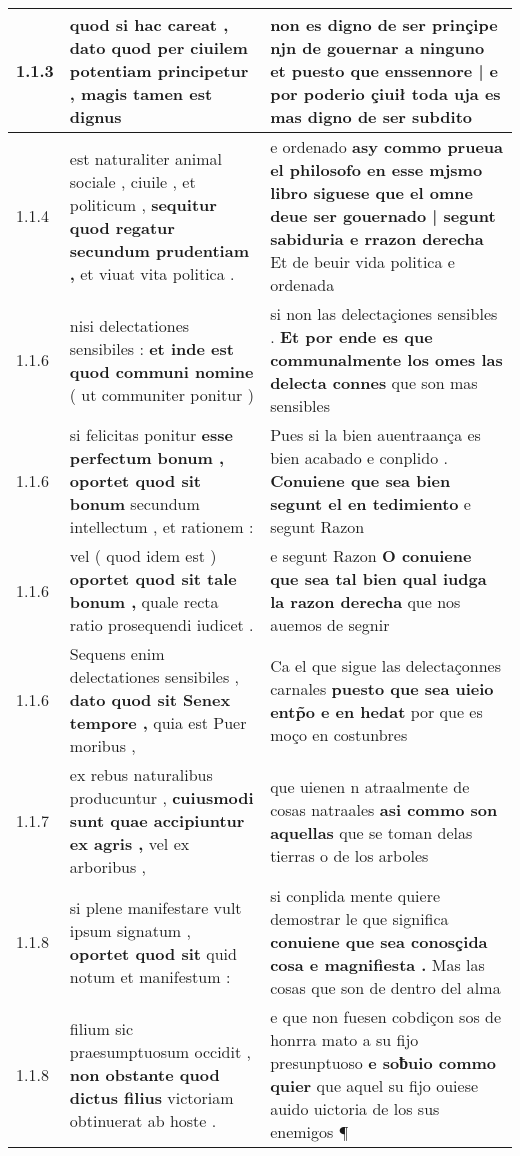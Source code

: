 \begin{tabular}{|p{1cm}|p{6.5cm}|p{6.5cm}|}

\hline
1.1.3 & quod si hac careat , \textbf{ dato quod per ciuilem potentiam principetur , } magis tamen est dignus & non es digno de ser prinçipe \textbf{ njn de gouernar a ninguno et puesto que enssennore | e por poderio çiuił toda uja } es mas digno de ser subdito \\\hline
1.1.4 & est naturaliter animal sociale , ciuile , et politicum , \textbf{ sequitur quod regatur secundum prudentiam , } et viuat vita politica . & e ordenado \textbf{ asy commo prueua el philosofo en esse mjsmo libro siguese que el omne deue ser gouernado | segunt sabiduria e rrazon derecha } Et de beuir vida politica e ordenada \\\hline
1.1.6 & nisi delectationes sensibiles : \textbf{ et inde est quod communi nomine } ( ut communiter ponitur ) & si non las delectaçiones sensibles . \textbf{ Et por ende es que communalmente los omes las delecta connes } que son mas sensibles \\\hline
1.1.6 & si felicitas ponitur \textbf{ esse perfectum bonum , oportet quod sit bonum } secundum intellectum , et rationem : & Pues si la bien auentraança es bien acabado e conplido . \textbf{ Conuiene que sea bien segunt el en tedimiento } e segunt Razon \\\hline
1.1.6 & vel ( quod idem est ) \textbf{ oportet quod sit tale bonum , } quale recta ratio prosequendi iudicet . & e segunt Razon \textbf{ O conuiene que sea tal bien qual iudga la razon derecha } que nos auemos de segnir \\\hline
1.1.6 & Sequens enim delectationes sensibiles , \textbf{ dato quod sit Senex tempore , } quia est Puer moribus , & Ca el que sigue las delectaçonnes carnales \textbf{ puesto que sea uieio entp̃o e en hedat } por que es moço en costunbres \\\hline
1.1.7 & ex rebus naturalibus producuntur , \textbf{ cuiusmodi sunt quae accipiuntur ex agris , } vel ex arboribus , & que uienen n atraalmente de cosas natraales \textbf{ asi commo son aquellas } que se toman delas tierras o de los arboles \\\hline
1.1.8 & si plene manifestare vult ipsum signatum , \textbf{ oportet quod sit } quid notum et manifestum : & si conplida mente quiere demostrar le que significa \textbf{ conuiene que sea conosçida cosa e magnifiesta . } Mas las cosas que son de dentro del alma \\\hline
1.1.8 & filium sic praesumptuosum occidit , \textbf{ non obstante quod dictus filius } victoriam obtinuerat ab hoste . & e que non fuesen cobdiçon sos de honrra mato a su fijo presunptuoso \textbf{ e soƀuio commo quier } que aquel su fijo ouiese auido uictoria de los sus enemigos ¶ \\\hline

\end{tabular}
